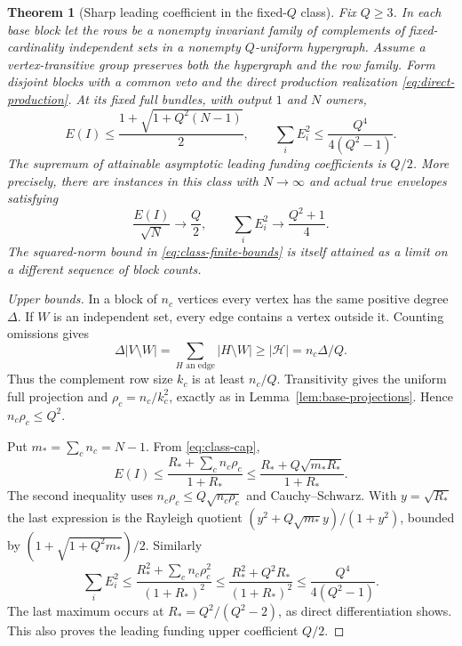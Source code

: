 \documentclass[11pt]{article}
\newtheorem{theorem}{Theorem}[section]
\theoremstyle{definition}
\theoremstyle{remark}
\begin{document}
\begin{theorem}[Sharp leading coefficient in the fixed-$Q$ class]
\label{thm:sharp-class}
Fix $Q\ge3$.  In each base block let the rows be a nonempty invariant
family of complements of fixed-cardinality independent sets in a
nonempty $Q$-uniform hypergraph.  Assume a vertex-transitive group
preserves both the hypergraph and the row family.  Form disjoint blocks
with a common veto and the direct production realization
\eqref{eq:direct-production}.  At its fixed full bundles, with output
$1$ and $N$ owners,
\begin{equation}
 E(I)\le\frac{1+\sqrt{1+Q^2(N-1)}}2,\qquad
 \sum_i E_i^2\le\frac{Q^4}{4(Q^2-1)}.
 \label{eq:class-finite-bounds}
\end{equation}
The supremum of attainable asymptotic leading funding coefficients is
$Q/2$.  More precisely, there are instances in this class with $N\to\infty$
and actual true envelopes satisfying
\begin{equation}
 \frac{E(I)}{\sqrt N}\longrightarrow\frac Q2,\qquad
 \sum_i E_i^2\longrightarrow\frac{Q^2+1}{4}.
 \label{eq:sharp-c-one}
\end{equation}
The squared-norm bound in \eqref{eq:class-finite-bounds} is itself
attained as a limit on a different sequence of block counts.
\end{theorem}
\begin{proof}[Upper bounds]
In a block of $n_c$ vertices every vertex has the same positive degree
$\Delta$.  If $W$ is an independent set, every edge contains a vertex
outside it.  Counting omissions gives
\[
 \Delta|V\setminus W|=\sum_{H\text{ an edge}}|H\setminus W|
                     \ge |\mathcal H|=n_c\Delta/Q.
\]
Thus the complement row size $k_c$ is at least $n_c/Q$.
Transitivity gives the uniform full projection and
$\rho_c=n_c/k_c^2$, exactly as in Lemma~\ref{lem:base-projections}.
Hence $n_c\rho_c\le Q^2$.

Put $m_* =\sum_c n_c=N-1$.  From \eqref{eq:class-cap},
\[
 E(I)\le\frac{R_*+\sum_c n_c\rho_c}{1+R_*}
 \le\frac{R_*+Q\sqrt{m_*R_*}}{1+R_*}.
\]
The second inequality uses $n_c\rho_c\le Q\sqrt{n_c\rho_c}$ and
Cauchy--Schwarz.  With $y=\sqrt{R_*}$ the last expression is the
Rayleigh quotient $(y^2+Q\sqrt{m_*}y)/(1+y^2)$, bounded by
$(1+\sqrt{1+Q^2m_*})/2$.  Similarly
\[
 \sum_i E_i^2\le
 \frac{R_*^2+\sum_c n_c\rho_c^2}{(1+R_*)^2}
 \le\frac{R_*^2+Q^2R_*}{(1+R_*)^2}
 \le\frac{Q^4}{4(Q^2-1)}.
\]
The last maximum occurs at $R_*=Q^2/(Q^2-2)$, as direct
differentiation shows.  This also proves the leading funding upper
coefficient $Q/2$.
\end{proof}
\end{document}
